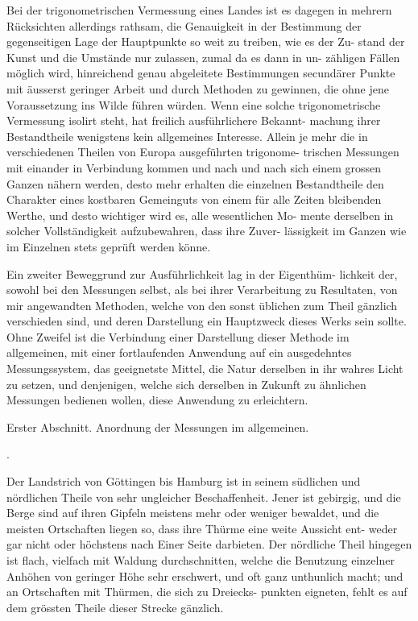 \documentclass[12pt,a4paper]{article}
\theoremstyle{plain}
\theoremstyle{definition}
\theoremstyle{remark}
\begin{document}
\noindent
Bei der trigonometrischen Vermessung eines Landes ist es dagegen in
mehrern Rücksichten allerdings rathsam, die Genauigkeit in der Bestimmung
der gegenseitigen Lage der Hauptpunkte so weit zu treiben, wie es der Zu-
stand der Kunst und die Umstände nur zulassen, zumal da es dann in un-
zähligen Fällen möglich wird, hinreichend genau abgeleitete Bestimmungen
secundärer Punkte mit äusserst geringer Arbeit und durch Methoden zu gewinnen,
die ohne jene Voraussetzung ins Wilde führen würden. Wenn eine solche
trigonometrische Vermessung isolirt steht, hat freilich ausführlichere Bekannt-
machung ihrer Bestandtheile wenigstens kein allgemeines Interesse. Allein
je mehr die in verschiedenen Theilen von Europa ausgeführten trigonome-
trischen Messungen mit einander in Verbindung kommen und nach und nach
sich einem grossen Ganzen nähern werden, desto mehr erhalten die einzelnen
Bestandtheile den Charakter eines kostbaren Gemeinguts von einem für alle
Zeiten bleibenden Werthe, und desto wichtiger wird es, alle wesentlichen Mo-
mente derselben in solcher Vollständigkeit aufzubewahren, dass ihre Zuver-
lässigkeit im Ganzen wie im Einzelnen stets geprüft werden könne.

\noindent
Ein zweiter Beweggrund zur Ausführlichkeit lag in der Eigenthüm-
lichkeit der, sowohl bei den Messungen selbst, als bei ihrer Verarbeitung zu
Resultaten, von mir angewandten Methoden, welche von den sonst üblichen
zum Theil gänzlich verschieden sind, und deren Darstellung ein Hauptzweck
dieses Werks sein sollte. Ohne Zweifel ist die Verbindung einer Darstellung
dieser Methode im allgemeinen, mit einer fortlaufenden Anwendung auf ein
ausgedehntes Messungssystem, das geeignetste Mittel, die Natur derselben in
ihr wahres Licht zu setzen, und denjenigen, welche sich derselben in Zukunft
zu ähnlichen Messungen bedienen wollen, diese Anwendung zu erleichtern.

\noindent

\noindent

\noindent
Erster Abschnitt.
Anordnung der Messungen im allgemeinen.

.

\noindent
Der Landstrich von Göttingen bis Hamburg ist in seinem südlichen und
nördlichen Theile von sehr ungleicher Beschaffenheit. Jener ist gebirgig, und
die Berge sind auf ihren Gipfeln meistens mehr oder weniger bewaldet, und
die meisten Ortschaften liegen so, dass ihre Thürme eine weite Aussicht ent-
weder gar nicht oder höchstens nach Einer Seite darbieten. Der nördliche
Theil hingegen ist flach, vielfach mit Waldung durchschnitten, welche die
Benutzung einzelner Anhöhen von geringer Höhe sehr erschwert, und oft
ganz unthunlich macht; und an Ortschaften mit Thürmen, die sich zu Dreiecks-
punkten eigneten, fehlt es auf dem grössten Theile dieser Strecke gänzlich.
\end{document}
